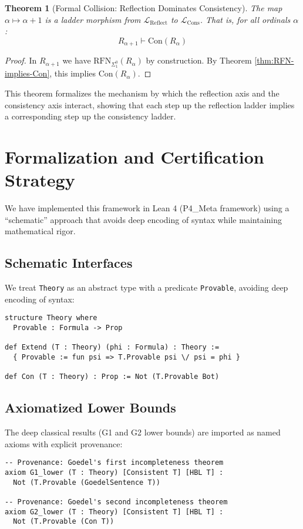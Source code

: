 \documentclass[11pt]{article}
\newtheorem{theorem}{Theorem}[section]
\newcommand{\Con}{\mathrm{Con}}
\newcommand{\RFNSigOne}{\mathrm{RFN}_{\Sigma^0_1}}
\newcommand{\LCons}{\mathcal{L}_{\mathrm{Cons}}}
\newcommand{\LReflect}{\mathcal{L}_{\mathrm{Reflect}}}
\begin{document}
\begin{theorem}[Formal Collision: Reflection Dominates Consistency]
The map $\alpha \mapsto \alpha+1$ is a ladder morphism from $\LReflect$ to $\LCons$. That is, for all ordinals $\alpha$:
$$R_{\alpha+1} \vdash \Con(R_\alpha)$$
\end{theorem}
\begin{proof}
In $R_{\alpha+1}$ we have $\RFNSigOne(R_\alpha)$ by construction. By Theorem \ref{thm:RFN-implies-Con}, this implies $\Con(R_\alpha)$.
\end{proof}

This theorem formalizes the mechanism by which the reflection axis and the consistency axis interact, showing that each step up the reflection ladder implies a corresponding step up the consistency ladder.

\section{Formalization and Certification Strategy}
We have implemented this framework in Lean 4 (P4\_Meta framework) using a ``schematic'' approach that avoids deep encoding of syntax while maintaining mathematical rigor.

\subsection{Schematic Interfaces}
We treat \texttt{Theory} as an abstract type with a predicate \texttt{Provable}, avoiding deep encoding of syntax:

\begin{lstlisting}[language=Lean, caption={Core Theory Interface}]
structure Theory where
  Provable : Formula -> Prop

def Extend (T : Theory) (phi : Formula) : Theory :=
  { Provable := fun psi => T.Provable psi \/ psi = phi }

def Con (T : Theory) : Prop := Not (T.Provable Bot)
\end{lstlisting}

\subsection{Axiomatized Lower Bounds}
The deep classical results (G1 and G2 lower bounds) are imported as named axioms with explicit provenance:

\begin{lstlisting}[language=Lean, caption={Named Classical Axioms}]
-- Provenance: Goedel's first incompleteness theorem
axiom G1_lower (T : Theory) [Consistent T] [HBL T] :
  Not (T.Provable (GoedelSentence T))

-- Provenance: Goedel's second incompleteness theorem  
axiom G2_lower (T : Theory) [Consistent T] [HBL T] :
  Not (T.Provable (Con T))
\end{lstlisting}
\end{document}
